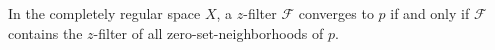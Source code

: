 In the completely regular space $X$, a $z$-filter $\mathcal{F}$ converges to $p$ if and only if $\mathcal{F}$ contains the $z$-filter of all zero-set-neighborhoods of $p$.
